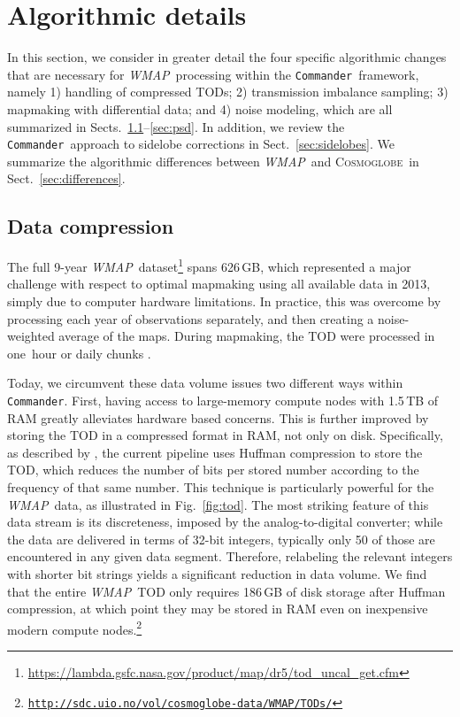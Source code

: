\documentclass[twocolumn]{aa}
\def\WMAP{\emph{WMAP}}
\def\wmap{\emph{WMAP}}
\def\commander{\texttt{Commander}}
\newcommand{\cosmoglobe}{\textsc{Cosmoglobe}}
\begin{document}
\section{Algorithmic details}
\label{sec:algorithms}


In this section, we consider in greater detail the four specific algorithmic
changes that are necessary for \WMAP\ processing within the \commander\ framework,
namely 1) handling of compressed TODs; 2) transmission imbalance sampling; 3) mapmaking with differential data;
and 4) noise modeling, which are all summarized in Sects.~\ref{subsec:compression}--\ref{sec:psd}. In addition, we review the \commander\ approach to sidelobe
corrections in Sect.~\ref{sec:sidelobes}. We summarize the algorithmic differences between \wmap\ and \cosmoglobe\ in Sect.~\ref{sec:differences}.

\subsection{Data compression}
\label{subsec:compression}

The full 9-year \WMAP\ dataset\footnote{\url{https://lambda.gsfc.nasa.gov/product/map/dr5/tod_uncal_get.cfm}}
spans 626\,GB, which represented a major challenge with respect to optimal
mapmaking using all available data in 2013, simply due to computer hardware
limitations. In practice, this was overcome by processing each year of
observations separately, and then creating a noise-weighted average of the
maps. During mapmaking, the TOD were processed in one~hour or daily chunks
\citep{bennett2012}.

Today, we circumvent these data volume issues two different ways within \commander. 
First, having access to large-memory compute nodes with 1.5\,TB
of RAM greatly alleviates hardware based concerns. This is further improved by storing the TOD in a compressed format in RAM, not
only on disk. Specifically, as described by \citet{bp03}, the current pipeline
uses Huffman compression to store the TOD, which reduces the number of bits per
stored number according to the frequency of that same number. This technique is
particularly powerful for the \WMAP\ data, as illustrated in
Fig.~\ref{fig:tod}. The most striking feature of this data stream is its
discreteness, imposed by the analog-to-digital converter; while the data are
delivered in terms of 32\nobreakdash-bit integers, typically only 50 of those are
encountered in any given data segment. Therefore, relabeling the relevant
integers with shorter bit strings yields a significant reduction in data volume. We
find that the entire \WMAP\ TOD only requires 186\,GB of disk storage after Huffman
compression, at which point they may be stored in RAM even on inexpensive modern
compute nodes.\footnote{\href{http://sdc.uio.no/vol/cosmoglobe-data/WMAP/TODs/}
{\texttt{http://sdc.uio.no/vol/cosmoglobe-data/WMAP/TODs/}}}
\end{document}
